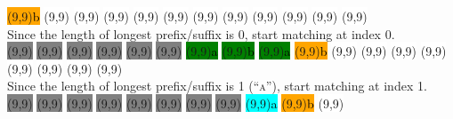\begin{center}
  \colorbox{orange}{\makebox(9,9){\textcolor{black}{b}}}
  \colorbox{white}{\makebox(9,9){\textcolor{black}{}}}
  \colorbox{white}{\makebox(9,9){\textcolor{black}{}}}
  \colorbox{white}{\makebox(9,9){\textcolor{black}{}}}
  \colorbox{white}{\makebox(9,9){\textcolor{black}{}}}
  \colorbox{white}{\makebox(9,9){\textcolor{black}{}}}
  \colorbox{white}{\makebox(9,9){\textcolor{black}{}}}
  \colorbox{white}{\makebox(9,9){\textcolor{black}{}}}
  \colorbox{white}{\makebox(9,9){\textcolor{black}{}}}
  \colorbox{white}{\makebox(9,9){\textcolor{black}{}}}
  \colorbox{white}{\makebox(9,9){\textcolor{black}{}}}
  \colorbox{white}{\makebox(9,9){\textcolor{black}{}}}
  \\
  Since the length of longest prefix/suffix is 0, start matching at index 0.
  \\
  \colorbox{gray}{\makebox(9,9){\textcolor{black}{}}}
  \colorbox{gray}{\makebox(9,9){\textcolor{black}{}}}
  \colorbox{gray}{\makebox(9,9){\textcolor{black}{}}}
  \colorbox{gray}{\makebox(9,9){\textcolor{black}{}}}
  \colorbox{gray}{\makebox(9,9){\textcolor{black}{}}}
  \colorbox{gray}{\makebox(9,9){\textcolor{black}{}}}
  \colorbox{green}{\makebox(9,9){\textcolor{black}{a}}}
  \colorbox{green}{\makebox(9,9){\textcolor{black}{b}}}
  \colorbox{green}{\makebox(9,9){\textcolor{black}{a}}}
  \colorbox{orange}{\makebox(9,9){\textcolor{black}{b}}}
  \colorbox{white}{\makebox(9,9){\textcolor{black}{}}}
  \colorbox{white}{\makebox(9,9){\textcolor{black}{}}}
  \colorbox{white}{\makebox(9,9){\textcolor{black}{}}}
  \colorbox{white}{\makebox(9,9){\textcolor{black}{}}}
  \colorbox{white}{\makebox(9,9){\textcolor{black}{}}}
  \colorbox{white}{\makebox(9,9){\textcolor{black}{}}}
  \colorbox{white}{\makebox(9,9){\textcolor{black}{}}}
  \colorbox{white}{\makebox(9,9){\textcolor{black}{}}}
  \\
  Since the length of longest prefix/suffix is 1 (\textsc{``a''}), start matching at index 1.
  \\
  \colorbox{gray}{\makebox(9,9){\textcolor{black}{}}}
  \colorbox{gray}{\makebox(9,9){\textcolor{black}{}}}
  \colorbox{gray}{\makebox(9,9){\textcolor{black}{}}}
  \colorbox{gray}{\makebox(9,9){\textcolor{black}{}}}
  \colorbox{gray}{\makebox(9,9){\textcolor{black}{}}}
  \colorbox{gray}{\makebox(9,9){\textcolor{black}{}}}
  \colorbox{gray}{\makebox(9,9){\textcolor{black}{}}}
  \colorbox{gray}{\makebox(9,9){\textcolor{black}{}}}
  \colorbox{cyan}{\makebox(9,9){\textcolor{black}{a}}}
  \colorbox{orange}{\makebox(9,9){\textcolor{black}{b}}}
  \colorbox{white}{\makebox(9,9){\textcolor{black}{}}}

\end{center}
